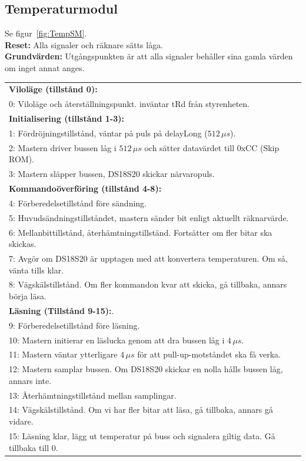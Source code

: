 \documentclass[a4paper,11pt]{article}
\begin{document}
	\pagebreak

		\subsection{Temperaturmodul}
			Se figur~\ref{fig:TempSM}.\\
			{\bf Reset:} Alla signaler och räknare sätts låga.\\
			{\bf Grundvärden:} Utgångspunkten är att alla signaler behåller sina gamla värden om inget annat anges.\\
			\begin{tabular}{l}
				\\{\bf Viloläge (tillstånd 0):}\\
				0: Viloläge och återställningspunkt. inväntar tRd från styrenheten.\\
				{\bf Initialisering (tillstånd 1-3):}\\
				1: Fördröjningstillstånd, väntar på puls på delayLong ($512 \, \mu s$).\\
				2: Mastern driver bussen låg i $512 \, \mu s$ och sätter datavärdet till 0xCC (Skip ROM).\\
				3: Mastern släpper bussen, DS18S20 skickar närvaropuls.\\
				{\bf Kommandoöverföring (tillstånd 4-8):}\\
				4: Förberedelsetillstånd före sändning.\\
				5: Huvudsändningstillståndet, mastern sänder bit enligt aktuellt räknarvärde.\\
				6: Mellanbittillstånd, återhämtningstillständ. Fortsätter om fler bitar ska skickas.\\
				7: Avgör om DS18S20 är upptagen med att konvertera temperaturen. Om så, vänta tills klar.\\
				8: Vägskälstillstånd. Om fler kommandon kvar att skicka, gå tillbaka, annars börja läsa.\\
				{\bf Läsning (Tillstånd 9-15):}.\\
				9:  Förberedelsetillstånd före läsning.\\
				10: Mastern initierar en läslucka genom att dra bussen låg i $4 \, \mu s$.\\
				11: Mastern väntar ytterligare $4 \, \mu s$ för att pull-up-motståndet ska få verka.\\
				12: Mastern samplar bussen. Om DS18S20 skickar en nolla hålls bussen låg, annars inte.\\
				13: Återhämtningstillstånd mellan samplingar.\\
				14: Vägskälstillstånd. Om vi har fler bitar att läsa, gå tillbaka, annars gå vidare.\\
				15: Läsning klar, lägg ut temperatur på buss och signalera giltig data. Gå tillbaka till 0.\\
			\end{tabular}
\end{document}
